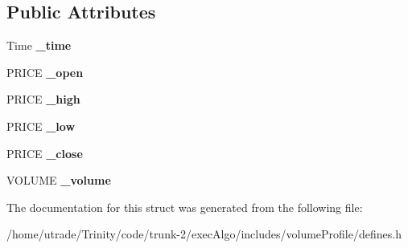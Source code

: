 \subsection*{Public Attributes}
\begin{DoxyCompactItemize}
\item 
\hypertarget{structmutrade_1_1_data_a_p_i_1_1_data_a762d14cc7a45157b4bf3d27472c3f367}{Time {\bfseries \-\_\-time}}\label{structmutrade_1_1_data_a_p_i_1_1_data_a762d14cc7a45157b4bf3d27472c3f367}

\item 
\hypertarget{structmutrade_1_1_data_a_p_i_1_1_data_a7a937af2e33d1ce3c940ec99545e0aa1}{P\-R\-I\-C\-E {\bfseries \-\_\-open}}\label{structmutrade_1_1_data_a_p_i_1_1_data_a7a937af2e33d1ce3c940ec99545e0aa1}

\item 
\hypertarget{structmutrade_1_1_data_a_p_i_1_1_data_a7a74e33940922f191b615c539873c6ce}{P\-R\-I\-C\-E {\bfseries \-\_\-high}}\label{structmutrade_1_1_data_a_p_i_1_1_data_a7a74e33940922f191b615c539873c6ce}

\item 
\hypertarget{structmutrade_1_1_data_a_p_i_1_1_data_ae8739cb38d827e0c4a2a905da08b8789}{P\-R\-I\-C\-E {\bfseries \-\_\-low}}\label{structmutrade_1_1_data_a_p_i_1_1_data_ae8739cb38d827e0c4a2a905da08b8789}

\item 
\hypertarget{structmutrade_1_1_data_a_p_i_1_1_data_a0f815d9b9922fba87169b04b9a6c8591}{P\-R\-I\-C\-E {\bfseries \-\_\-close}}\label{structmutrade_1_1_data_a_p_i_1_1_data_a0f815d9b9922fba87169b04b9a6c8591}

\item 
\hypertarget{structmutrade_1_1_data_a_p_i_1_1_data_a0b459f487bea2d24bb3e5b2fba1e0375}{V\-O\-L\-U\-M\-E {\bfseries \-\_\-volume}}\label{structmutrade_1_1_data_a_p_i_1_1_data_a0b459f487bea2d24bb3e5b2fba1e0375}

\end{DoxyCompactItemize}


The documentation for this struct was generated from the following file\-:\begin{DoxyCompactItemize}
\item 
/home/utrade/\-Trinity/code/trunk-\/2/exec\-Algo/includes/volume\-Profile/defines.\-h\end{DoxyCompactItemize}
